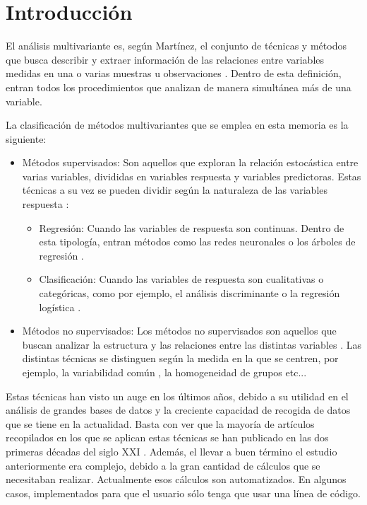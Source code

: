 \chapter*{Introducción}
\noindent El análisis multivariante es, según Martínez, el conjunto de técnicas y métodos que busca describir y extraer información de las relaciones entre variables medidas en una o varias muestras u observaciones \cite{Rosario 1999}. Dentro de esta definición, entran todos los procedimientos que analizan de manera simultánea más de una variable. 

\noindent La clasificación de métodos multivariantes que se emplea en esta memoria es la siguiente:
\begin{itemize}
\item Métodos supervisados: Son aquellos que exploran la relación estocástica entre varias variables, divididas en variables respuesta y variables predictoras. Estas técnicas a su vez se pueden dividir según la naturaleza de las variables respuesta \cite{James 2013}:
\begin{itemize}
\item Regresión:  Cuando las variables de respuesta son continuas. Dentro de esta tipología, entran métodos como las  redes neuronales \cite{Mamidi 2021} o los árboles  de regresión \cite{Nerini 2007}. 
\item Clasificación: Cuando las variables de respuesta son cualitativas o categóricas, como por ejemplo, el análisis discriminante \cite{Diez 2002} o la   regresión logística \cite{Ensum 2005}.
\end{itemize}
\item Métodos no supervisados:  Los métodos no supervisados son aquellos que buscan analizar la estructura y las relaciones entre las distintas variables \cite{Hastie 2001}. Las distintas técnicas se distinguen según la medida en la que se centren, por ejemplo, la variabilidad común \cite{Pages 2005}, la homogeneidad de grupos \cite{Okazaki 2006} etc...
\end{itemize}

\noindent Estas técnicas han visto un auge en los últimos años, debido a su utilidad en el análisis de grandes bases de datos y la creciente capacidad de recogida de datos que se tiene en la actualidad. Basta con ver que la mayoría de artículos recopilados en los que se aplican estas técnicas se han publicado en las dos primeras décadas del siglo XXI \cite{Diaz 2006, Galindo 2015,Diez 2002, Echeverri 2015}. Además, el llevar a buen término el estudio anteriormente era complejo, debido a la gran cantidad de cálculos que se necesitaban realizar. Actualmente esos cálculos son automatizados. En algunos casos, implementados para que el usuario sólo tenga que usar una línea de código.


